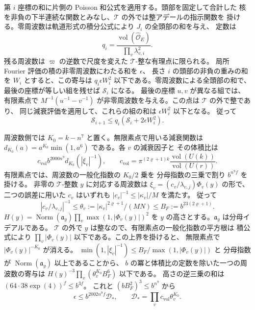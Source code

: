 第 \(i\) 座標の和に片側の Poisson 和公式を適用する。頭部を固定して合計した
核を非負の下半連続な関数とみなし、\(\mathcal T\) の外では整アデールの指示関数を
掛ける。零周波数は軌道形式の積分公式により \(J_i\) の全頭部の和を与え、
定数は
\[
  q_i=\frac{\operatorname{vol}(\widehat{\mathcal O}_E)}
                 {\prod_v\lambda_{v,i}^2}.
\]
残る周波数は \(\varpi\) の逆数で尺度を変えた \(\mathcal T\)-整な有理点に限られる。
局所 Fourier 評価の積の非零周波数にわたる和を \(\epsilon\)、
長さ \(i\) の頭部の非負の重みの和を \(W_i\) とすると、この寄与は
\(q_i\epsilon W_i^2\) 以下である。零周波数による全頭部の和で、
最後の座標が等しい組を残せば \(\mathcal S_i\) になる。
最後の座標 \(u,v\) が異なる組では、有限素点で
\(M^{-1}(u^{-1}-v^{-1})\) が非零周波数を与える。この点は \(\mathcal T\) の外で整であり、
同じ減衰評価を適用して、これらの組の和は \(\epsilon W_i^2\) 以下となる。
従って
\[
 \mathcal S_{i+1}\le q_i(\mathcal S_i+2\epsilon W_i^2).
\]

周波数側では \(K_0=k-n^7\) と置く。無限素点で用いる減衰関数は
\(d_{K_0}(a)=a^{K_0}\min(1,a^6)\) である。各 \(v\) の減衰因子と
その体積比は
\[
 c_{\mathrm{vol}}b^{2000n^9}d_{K_0}(|\xi_v|^{-1}),
 \qquad
 c_{\mathrm{vol}}=\pi^{(2\varrho+1)k}
            \frac{\operatorname{vol}(U(k))}{\operatorname{vol}(U(r))}.
\]
有限素点では、周波数の一般化指数の \(K_0/2\) 乗を
分母指数の三乗で割り \(b^{n^9 f}\) を掛ける。
非零の \(\mathcal T\)-整数 \(y\) に対応する周波数は
\(\xi_v=(c_v/\lambda_{v,j})\Phi_v(y)\) の形で、
二つの誤差に用いた \(c_v\) はいずれも \(|c_v|^{-1}\le|\kappa_v|/M\) を満たす。
従って
\[
 |c_v/\lambda_{v,j}|^{-1}\le
 \theta_v:=|\kappa_v|^{2\varrho+1}/(MN)
 \le B_F:=b^{23(2\varrho+1)}.
\]
\(H(y)=\operatorname{Norm}(\mathfrak a_y)\prod_v\max(1,|\Phi_v(y)|)^2\)
を \(y\) の高さとする。\(\mathfrak a_y\) は分母イデアルである。
\(\mathcal T\) の外で \(y\) は整なので、有限素点の一般化指数の平方根は
積公式により \(\prod_v|\Phi_v(y)|\) 以下である。この上界を掛けると、
無限素点で \(|\Phi_v(y)|^{-K_0}\) が消える。
\(\min(1,|\xi_v|^{-1})\le B_F/\max(1,|\Phi_v(y)|)\) と
分母指数が \(\operatorname{Norm}(\mathfrak a_y)\) 以上であることから、
\(b\) の冪と体積比の定数を除いた一つの周波数の寄与は
\(H(y)^{-3}\prod_v(\theta_v^{K_0}B_F^6)\) 以下である。
高さの逆三乗の和は \((64\cdot38\exp(4))^f\le b^{3f}\)。
これと \((bB_F^2)^3\le b^{n^9}\) から
\[
 \epsilon\le b^{2002n^9f}\mathcal D_\ast,\qquad
 \mathcal D_\ast=\prod_v c_{\mathrm{vol}}\theta_v^{K_0}.
\]

